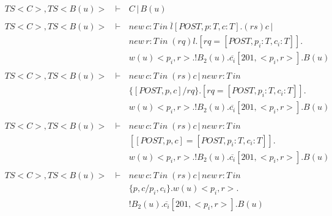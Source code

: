 \setcounter{equation}{0}
\begin{eqnarray*}
 \ TS<C>,TS<B(u)>\, &\vdash\,&  C\,|\,B(u) \\
 \               &        &          \\
 \ TS<C>,TS<B(u)>\, &\vdash\,& new\,c:T\,in\;\overline{l}[POST,p:T,c:T].(rs)c\,|\\
 \               &\,      & new\,r:T\,in\;(rq)l.[rq = [POST,p_i:T,c_i:T]].\\
 \               &        & w(u)<p_i,r>.!B_2(u).\overline{c_i}[201,<p_i,r>].B(u) \\
 \               &        &          \\
 \ TS<C>,TS<B(u)>\, &\vdash\,& new\,c:T\,in\;(rs)c\,|\,new\,r:T\,in\;\\
 \               &\,      & \{[POST,p,c]/rq\}.[rq = [POST,p_i:T,c_i:T]].\\
 \               &        & w(u)<p_i,r>.!B_2(u).\overline{c_i}[201,<p_i,r>].B(u) \\
 \               &        &          \\
 \ TS<C>,TS<B(u)>\, &\vdash\,& new\,c:T\,in\;(rs)c\,|\,new\,r:T\,in\;\\
 \               &\,      & [[POST,p,c] = [POST,p_i:T,c_i:T]].\\
 \               &        & w(u)<p_i,r>.!B_2(u).\overline{c_i}[201,<p_i,r>].B(u) \\
 \               &        &          \\
 \ TS<C>,TS<B(u)>\, &\vdash\,& new\,c:T\,in\;(rs)c\,|\,new\,r:T\,in\;\\
 \               &\,      & \{p,c/p_i,c_i\}.w(u)<p_i,r>.\\
 \               &        & !B_2(u).\overline{c_i}[201,<p_i,r>].B(u) \\
 \               &        &          \\
\end{eqnarray*}
